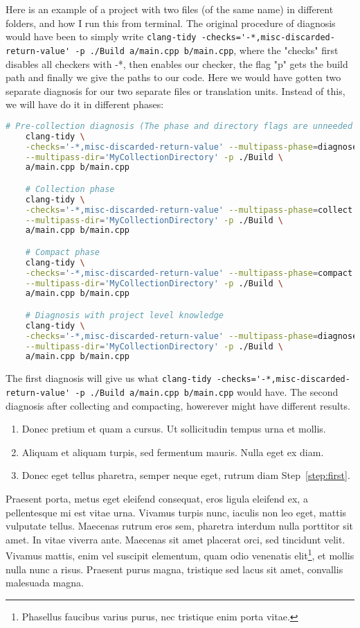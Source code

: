 Here is an example of a project with two files (of the same name) in different folders, and how I run this from terminal.
The original procedure of diagnosis would have been to simply write
\lstinline{clang-tidy -checks='-*,misc-discarded-return-value' -p ./Build a/main.cpp b/main.cpp},
where the "checks" first disables all checkers with -*, then enables our checker, the flag "p" gets the build path and finally
we give the paths to our code. Here we would have gotten two separate diagnosis for our two separate files or translation units.
Instead of this, we will have do it in different phases:

\begin{lstlisting}[language={bash}]
	# Pre-collection diagnosis (The phase and directory flags are unneeded in this scenario)
	clang-tidy \
	-checks='-*,misc-discarded-return-value' --multipass-phase=diagnose \
	--multipass-dir='MyCollectionDirectory' -p ./Build \
	a/main.cpp b/main.cpp

	# Collection phase
	clang-tidy \
	-checks='-*,misc-discarded-return-value' --multipass-phase=collect \
	--multipass-dir='MyCollectionDirectory' -p ./Build \
	a/main.cpp b/main.cpp

	# Compact phase
	clang-tidy \
	-checks='-*,misc-discarded-return-value' --multipass-phase=compact \
	--multipass-dir='MyCollectionDirectory' -p ./Build \
	a/main.cpp b/main.cpp

	# Diagnosis with project level knowledge
	clang-tidy \
	-checks='-*,misc-discarded-return-value' --multipass-phase=diagnose \
	--multipass-dir='MyCollectionDirectory' -p ./Build \
	a/main.cpp b/main.cpp
\end{lstlisting}

The first diagnosis will give us what \lstinline{clang-tidy -checks='-*,misc-discarded-return-value' -p ./Build a/main.cpp b/main.cpp}
would have. The second diagnosis after collecting and compacting, howerever might have different results.
\iffalse
\begin{enumerate}
	\item\label{step:first} Donec pretium et quam a cursus. Ut sollicitudin tempus urna et mollis.
	\item Aliquam et aliquam turpis, sed fermentum mauris. Nulla eget ex diam.
	\item Donec eget tellus pharetra, semper neque eget, rutrum diam Step~\ref{step:first}.
\end{enumerate}

Praesent porta, metus eget eleifend consequat, eros ligula eleifend ex, a pellentesque mi est vitae urna. Vivamus turpis nunc, iaculis non leo eget, mattis vulputate tellus. Maecenas rutrum eros sem, pharetra interdum nulla porttitor sit amet. In vitae viverra ante. Maecenas sit amet placerat orci, sed tincidunt velit. Vivamus mattis, enim vel suscipit elementum, quam odio venenatis elit\footnote{Phasellus faucibus varius purus, nec tristique enim porta vitae.}, et mollis nulla nunc a risus. Praesent purus magna, tristique sed lacus sit amet, convallis malesuada magna. 

